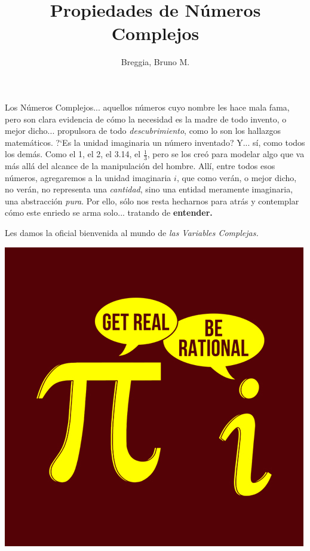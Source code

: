 \documentclass[12pt]{article}
\theoremstyle{definition}
\begin{document}
	\title{Propiedades de N\'umeros Complejos}
	\author{Breggia, Bruno M.}
	\date{}
	\maketitle
	
 Los N\'umeros Complejos... aquellos n\'umeros cuyo nombre les hace mala fama, pero son clara evidencia de c\'omo la necesidad es la madre de todo invento, o mejor dicho... propulsora de todo \textit{descubrimiento}, como lo son los hallazgos matem\'aticos. ?`Es la unidad imaginaria un n\'umero inventado? Y... s\'i, como todos los dem\'as. Como el 1, el 2, el 3.14, el $\frac{1}{3}$, pero se los cre\'o para modelar algo que va m\'as all\'a del alcance de la manipulaci\'on del hombre. All\'i, entre todos esos n\'umeros, agregaremos a la unidad imaginaria $i$, que como ver\'an, o mejor dicho, no ver\'an, no representa una \textit{cantidad}, sino una entidad meramente imaginaria, una abstracci\'on \textit{pura}. Por ello, s\'olo nos resta hecharnos para atr\'as y contemplar c\'omo este enriedo se arma solo... tratando de \textbf{entender.}
 
 Les damos la oficial bienvenida al mundo de \textit{las Variables Complejas.}\\
 \linebreak
	
	\begin{center}
		\includegraphics[scale=0.5]{math_joke.png}
	\end{center}
\end{document}
